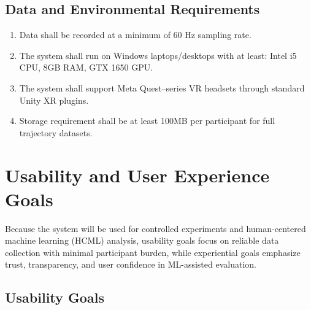 \documentclass[sigconf]{acmart}
\begin{document}
\subsection{Data and Environmental Requirements}
\begin{enumerate}[label=DER\arabic*:]
  \item Data shall be recorded at a minimum of 60 Hz sampling rate.
  \item The system shall run on Windows laptops/desktops with at least:
        Intel i5 CPU, 8GB RAM, GTX 1650 GPU.
  \item The system shall support Meta Quest–series VR headsets
        through standard Unity XR plugins.
  \item Storage requirement shall be at least 100MB per participant
        for full trajectory datasets.
\end{enumerate}


\section{Usability and User Experience Goals}

Because the system will be used for controlled experiments and human-centered machine learning (HCML) analysis, usability goals focus on reliable data collection with minimal participant burden, while experiential goals emphasize trust, transparency, and user confidence in ML-assisted evaluation.

\subsection{Usability Goals}
\end{document}
